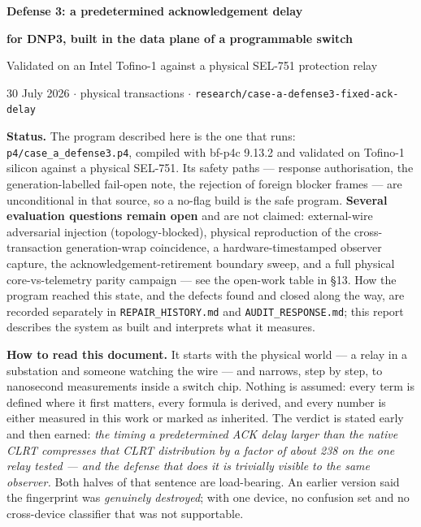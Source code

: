 \documentclass[10pt,a4paper,oneside]{article}
\newenvironment{keybox}{\begin{snugshade}\noindent\ignorespaces}{\end{snugshade}}
\newcommand{\code}[1]{\texttt{\small #1}}
\begin{document}
\begin{center}
{\LARGE\bfseries Defense 3: a predetermined acknowledgement delay\par}
\vspace{0.35em}
{\large\bfseries for DNP3, built in the data plane of a programmable switch\par}
\vspace{1.0em}
{\normalsize Validated on an Intel Tofino-1 against a physical SEL-751 protection relay\par}
\vspace{0.5em}
{\small 30 July 2026 \quad$\cdot$ physical transactions \quad$\cdot$\quad
 \code{research/case-a-defense3-fixed-ack-delay}\par}
\end{center}

\vspace{0.8em}

\begin{keybox}
\textbf{Status.} The program described here is the one that runs:
\code{p4/case\_a\_defense3.p4}, compiled with bf-p4c 9.13.2 and validated on Tofino-1 silicon
against a physical SEL-751. Its safety paths --- response authorisation, the
generation-labelled fail-open note, the rejection of foreign blocker frames --- are
unconditional in that source, so a no-flag build is the safe program. \textbf{Several
evaluation questions remain open} and are not claimed: external-wire adversarial injection
(topology-blocked), physical reproduction of the cross-transaction generation-wrap
coincidence, a hardware-timestamped observer capture, the acknowledgement-retirement boundary
sweep, and a full physical core-vs-telemetry parity campaign --- see the open-work table in
\S13. How the program reached this state, and the defects found and closed along the way, are
recorded separately in \code{REPAIR\_HISTORY.md} and \code{AUDIT\_RESPONSE.md}; this report
describes the system as built and interprets what it measures.
\end{keybox}

\begin{keybox}
\textbf{How to read this document.} It starts with the physical world --- a relay in a
substation and someone watching the wire --- and narrows, step by step, to nanosecond
measurements inside a switch chip. Nothing is assumed: every term is defined where it
first matters, every formula is derived, and every number is either measured in this work
or marked as inherited. The verdict is stated early and then earned: \emph{the timing
a predetermined ACK delay larger than the native CLRT compresses that CLRT distribution by a
factor of about 238 on the one relay tested --- and the defense that does it is trivially
visible to the same observer.} Both halves of that sentence are load-bearing.
\textbf{} An earlier version said the fingerprint was \emph{genuinely destroyed};
with one device, no confusion set and no cross-device classifier that was not supportable.
\end{keybox}
\end{document}
